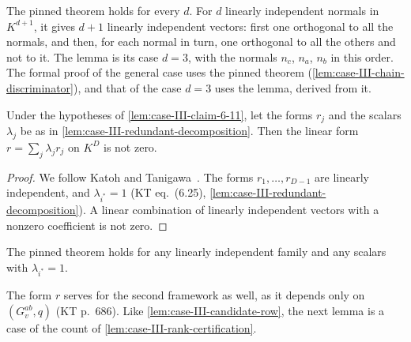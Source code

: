 \begin{fmlnote}
  The pinned theorem holds for every $d$. For $d$ linearly independent
  normals in $K^{d+1}$, it gives $d + 1$ linearly independent vectors:
  first one orthogonal to all the normals, and then, for each normal in
  turn, one orthogonal to all the others and not to it. The lemma is its
  case $d = 3$, with the normals $n_c$, $n_a$, $n_b$ in this order. The
  formal proof of the general case uses the pinned theorem
  (\cref{lem:case-III-chain-discriminator}), and that of the case
  $d = 3$ uses the lemma, derived from it.
\end{fmlnote}

\begin{lemma}
  \label{lem:case-III-claim612-r-nonzero}
  \leanok
  Under the hypotheses of \cref{lem:case-III-claim-6-11}, let the forms
  $r_j$ and the scalars $\lambda_j$ be as in
  \cref{lem:case-III-redundant-decomposition}. Then the linear form
  $r = \sum_j \lambda_j r_j$ on $K^D$ is not zero.
\end{lemma}
\begin{proof}
  \leanok
  We follow Katoh and Tanigawa~\cite[p.~690]{katohTanigawa2011}. The
  forms $r_1, \dots, r_{D-1}$ are linearly independent, and
  $\lambda_{i^*} = 1$ (KT eq.~(6.25),
  \cref{lem:case-III-redundant-decomposition}). A linear combination of
  linearly independent vectors with a nonzero coefficient is not zero.
\end{proof}

\begin{fmlnote}
  The pinned theorem holds for any linearly independent family and any
  scalars with $\lambda_{i^*} = 1$.
\end{fmlnote}

The form $r$ serves for the second framework as well, as it depends
only on $(G_v^{ab}, q)$ (KT p.~686). Like
\cref{lem:case-III-candidate-row}, the next lemma is a case of the count
of \cref{lem:case-III-rank-certification}.

